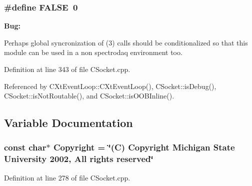 \subsubsection{\setlength{\rightskip}{0pt plus 5cm}\#define FALSE\ 0}\label{CSocket_8cpp_a0}


\begin{Desc}
\item[{\bf Bug: }]\par
 Perhaps global syncronization of (3) calls should be conditionalized so that this module can be used in a non spectrodaq environment too. \end{Desc}
 

Definition at line 343 of file CSocket.cpp.

Referenced by CXt\-Event\-Loop::CXt\-Event\-Loop(), CSocket::is\-Debug(), CSocket::is\-Not\-Routable(), and CSocket::is\-OOBInline().

\subsection{Variable Documentation}
\subsubsection{\setlength{\rightskip}{0pt plus 5cm}const char$\ast$ Copyright = \char`\"{}(C) Copyright Michigan State University 2002, All rights reserved\char`\"{}\hspace{0.3cm}{\tt  [static]}}\label{CSocket_8cpp_a1}




Definition at line 278 of file CSocket.cpp.